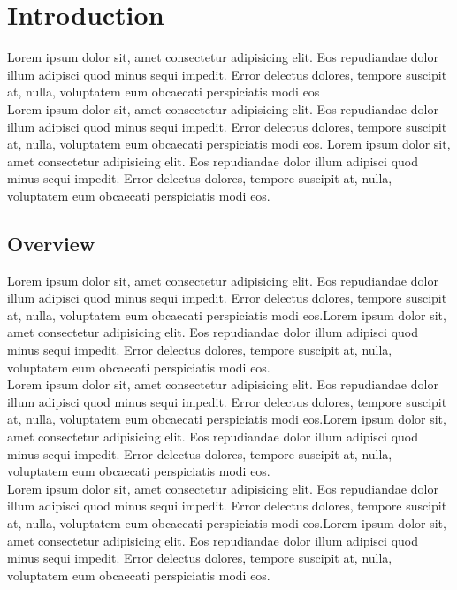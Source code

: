 \chapter{Introduction}\label{Introduction}
Lorem ipsum dolor sit, amet consectetur adipisicing elit. Eos repudiandae dolor illum adipisci quod minus sequi impedit. Error delectus dolores, tempore suscipit at, nulla, voluptatem eum obcaecati perspiciatis modi eos\\

Lorem ipsum dolor sit, amet consectetur adipisicing elit. Eos repudiandae dolor illum adipisci quod minus sequi impedit. Error delectus dolores, tempore suscipit at, nulla, voluptatem eum obcaecati perspiciatis modi eos. Lorem ipsum dolor sit, amet consectetur adipisicing elit. Eos repudiandae dolor illum adipisci quod minus sequi impedit. Error delectus dolores, tempore suscipit at, nulla, voluptatem eum obcaecati perspiciatis modi eos.

\section{Overview}
 Lorem ipsum dolor sit, amet consectetur adipisicing elit. Eos repudiandae dolor illum adipisci quod minus sequi impedit. Error delectus dolores, tempore suscipit at, nulla, voluptatem eum obcaecati perspiciatis modi eos.Lorem ipsum dolor sit, amet consectetur adipisicing elit. Eos repudiandae dolor illum adipisci quod minus sequi impedit. Error delectus dolores, tempore suscipit at, nulla, voluptatem eum obcaecati perspiciatis modi eos.\\

Lorem ipsum dolor sit, amet consectetur adipisicing elit. Eos repudiandae dolor illum adipisci quod minus sequi impedit. Error delectus dolores, tempore suscipit at, nulla, voluptatem eum obcaecati perspiciatis modi eos.Lorem ipsum dolor sit, amet consectetur adipisicing elit. Eos repudiandae dolor illum adipisci quod minus sequi impedit. Error delectus dolores, tempore suscipit at, nulla, voluptatem eum obcaecati perspiciatis modi eos.\\

Lorem ipsum dolor sit, amet consectetur adipisicing elit. Eos repudiandae dolor illum adipisci quod minus sequi impedit. Error delectus dolores, tempore suscipit at, nulla, voluptatem eum obcaecati perspiciatis modi eos.Lorem ipsum dolor sit, amet consectetur adipisicing elit. Eos repudiandae dolor illum adipisci quod minus sequi impedit. Error delectus dolores, tempore suscipit at, nulla, voluptatem eum obcaecati perspiciatis modi eos.


